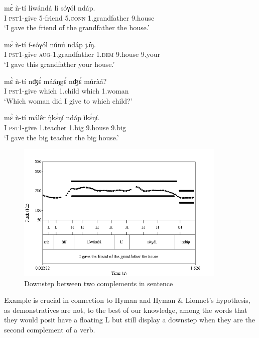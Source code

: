\documentclass[output=paper,newtxmath,modfonts,nonflat,hidelinks]{langsci/langscibook}
\begin{document}
\ea \gll m\`ɛ ǹ-tí líw{á}nd{á} lí sóγól {\textdownstep}nd{á}p.\\
I \textsc{pst1}-give 5-friend 5.\textsc{conn} 1.grandfather 9.house\\
\glt `I gave the friend of the grandfather the house.'\label{ex:HamlaouiMakasso:8} 
\z

\ea \gll m\`ɛ ǹ-tí í-{\textdownstep}sóγól núnú {\textdownstep}nd{á}p j\^ɔŋ.\\
I \textsc{pst1}-give \textsc{aug}-1.grandfather  1.\textsc{dem} 9.house 9.your\\
\glt `I gave this grandfather your house.'\label{ex:HamlaouiMakasso:9}
\z

\ea \gll  m\`ɛ ǹ-tí nʤ\'ɛ m{á}{á}ŋg\'ɛ {\textdownstep}nʤ\'ɛ múrà{á}?\\
I \textsc{pst1}-give which 1.child which 1.woman\\
\glt `Which woman did I give to which child?'\label{ex:HamlaouiMakasso:10}
\z

\ea \gll  m\`ɛ ǹ-tí m{á}lêr \`ŋk\'ɛŋí {\textdownstep}nd{á}p ìk\'ɛŋí.\\
I \textsc{pst1}-give 1.teacher 1.big 9.house 9.big\\
\glt `I gave the big teacher the big house.'\label{ex:HamlaouiMakasso:11}
\z

\begin{figure}

\caption{Downstep between two complements in sentence  \label{fig:HamlaouiMakasso:5}}
\includegraphics[width=10cm]{figures/ComplexO1Sept16B}

\end{figure}


\noindent Example  is crucial in connection to Hyman and Hyman \& Lionnet's hypothesis, as demonstratives are not, to the best of our knowledge, among the words that they would posit have a floating L  but still display a downstep when they are the second complement of a verb.
\end{document}
